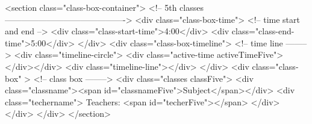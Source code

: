 
<section class="class-box-container">    <!-- 5th classes-------------------------------------------> 
  <div class="class-box-time">          <!-- time start and end -->
  <div class="class-start-time">4:00</div>
  <div class="class-end-time">5:00</div>
  </div>
  <div class="class-box-timeline">      <!-- time line -------->
  <div class="timeline-circle"> <div class="active-time activeTimeFive"></div></div>
  <div class="timeline-line"></div>
  </div>
  <div class="class-box" >              <!-- class box -------->
  <div class="classes classFive">
  <div class="classname"><span id="classnameFive">Subject</span></div>
  <div class="techername"> Teachers: <span id="techerFive"></span> </div>
 </div>
 </div> 
</section> 
